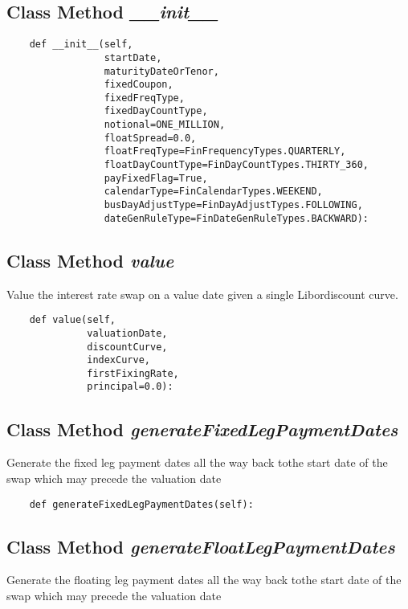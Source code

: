 \documentclass[twoside,11pt]{book}
\begin{document}
\subsection{Class Method {\it \_\_init\_\_}}


\begin{lstlisting}
    def __init__(self,
                 startDate,
                 maturityDateOrTenor,
                 fixedCoupon,
                 fixedFreqType,
                 fixedDayCountType,
                 notional=ONE_MILLION,
                 floatSpread=0.0,
                 floatFreqType=FinFrequencyTypes.QUARTERLY,
                 floatDayCountType=FinDayCountTypes.THIRTY_360,
                 payFixedFlag=True,
                 calendarType=FinCalendarTypes.WEEKEND,
                 busDayAdjustType=FinDayAdjustTypes.FOLLOWING,
                 dateGenRuleType=FinDateGenRuleTypes.BACKWARD):
\end{lstlisting}

\subsection{Class Method {\it value}}
Value the interest rate swap on a value date given a single Libordiscount curve. 

\begin{lstlisting}
    def value(self,
              valuationDate,
              discountCurve,
              indexCurve,
              firstFixingRate,
              principal=0.0):
\end{lstlisting}

\subsection{Class Method {\it generateFixedLegPaymentDates}}
Generate the fixed leg payment dates all the way back tothe start date of the swap which may precede the valuation date

\begin{lstlisting}
    def generateFixedLegPaymentDates(self):
\end{lstlisting}

\subsection{Class Method {\it generateFloatLegPaymentDates}}
Generate the floating leg payment dates all the way back tothe start date of the swap which may precede the valuation date
\end{document}
